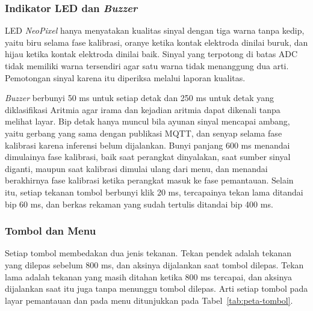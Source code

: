 \subsubsection{Indikator LED dan \textit{Buzzer}}

LED \textit{NeoPixel} hanya menyatakan kualitas sinyal dengan tiga warna tanpa kedip, yaitu biru selama fase kalibrasi, oranye ketika kontak elektroda dinilai buruk, dan hijau ketika kontak elektroda dinilai baik. Sinyal yang terpotong di batas ADC tidak memiliki warna tersendiri agar satu warna tidak menanggung dua arti. Pemotongan sinyal karena itu diperiksa melalui laporan kualitas.

\textit{Buzzer} berbunyi 50 ms untuk setiap detak dan 250 ms untuk detak yang diklasifikasi Aritmia agar irama dan kejadian aritmia dapat dikenali tanpa melihat layar. Bip detak hanya muncul bila ayunan sinyal mencapai ambang, yaitu gerbang yang sama dengan publikasi MQTT, dan senyap selama fase kalibrasi karena inferensi belum dijalankan. Bunyi panjang 600 ms menandai dimulainya fase kalibrasi, baik saat perangkat dinyalakan, saat sumber sinyal diganti, maupun saat kalibrasi dimulai ulang dari menu, dan menandai berakhirnya fase kalibrasi ketika perangkat masuk ke fase pemantauan. Selain itu, setiap tekanan tombol berbunyi klik 20 ms, tercapainya tekan lama ditandai bip 60 ms, dan berkas rekaman yang sudah tertulis ditandai bip 400 ms.

\subsubsection{Tombol dan Menu}

Setiap tombol membedakan dua jenis tekanan. Tekan pendek adalah tekanan yang dilepas sebelum 800 ms, dan aksinya dijalankan saat tombol dilepas. Tekan lama adalah tekanan yang masih ditahan ketika 800 ms tercapai, dan aksinya dijalankan saat itu juga tanpa menunggu tombol dilepas. Arti setiap tombol pada layar pemantauan dan pada menu ditunjukkan pada Tabel~\ref{tab:peta-tombol}.


